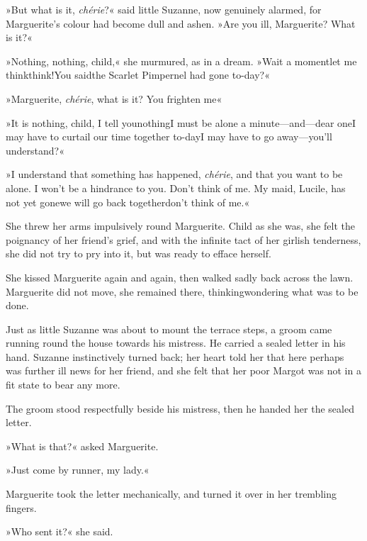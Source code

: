 »But what is it, \textit{chérie}?« said little Suzanne, now genuinely alarmed, for Marguerite's colour had become dull and ashen. »Are you ill, Marguerite? What is it?«

»Nothing, nothing, child,« she murmured, as in a dream. »Wait a moment\textellipsis \allowbreak  let me think\textellipsis \allowbreak  think!\textellipsis \allowbreak  You said\textellipsis \allowbreak  the Scarlet Pimpernel had gone to-day\textellipsis \allowbreak  ?«

»Marguerite, \textit{chérie}, what is it? You frighten me\textellipsis«

»It is nothing, child, I tell you\textellipsis \allowbreak  nothing\textellipsis \allowbreak  I must be alone a minute—and—dear one\textellipsis \allowbreak  I may have to curtail our time together to-day\textellipsis \allowbreak  I may have to go away—you'll understand?«

»I understand that something has happened, \textit{chérie}, and that you want to be alone. I won't be a hindrance to you. Don't think of me. My maid, Lucile, has not yet gone\textellipsis \allowbreak  we will go back together\textellipsis \allowbreak  don't think of me.«

She threw her arms impulsively round Marguerite. Child as she was, she felt the poignancy of her friend's grief, and with the infinite tact of her girlish tenderness, she did not try to pry into it, but was ready to efface herself.

She kissed Marguerite again and again, then walked sadly back across the lawn. Marguerite did not move, she remained there, thinking\textellipsis \allowbreak  wondering what was to be done.

Just as little Suzanne was about to mount the terrace steps, a groom came running round the house towards his mistress. He carried a sealed letter in his hand. Suzanne instinctively turned back; her heart told her that here perhaps was further ill news for her friend, and she felt that her poor Margot was not in a fit state to bear any more.

The groom stood respectfully beside his mistress, then he handed her the sealed letter.

»What is that?« asked Marguerite.

»Just come by runner, my lady.«

Marguerite took the letter mechanically, and turned it over in her trembling fingers.

»Who sent it?« she said.

